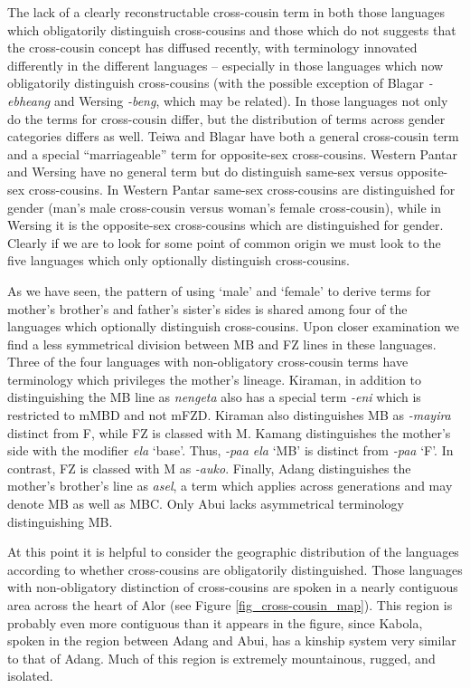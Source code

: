 The lack of a clearly reconstructable cross-cousin term in both those languages which obligatorily distinguish cross-cousins and those which do not suggests that the cross-cousin concept has diffused recently, with terminology innovated differently in the different languages -- especially in those languages which now obligatorily distinguish cross-cousins (with the possible exception of Blagar \textit{-ebheang} and Wersing \textit{-beng}, which may be related). In those languages not only do the terms for cross-cousin differ, but the distribution of terms across gender categories differs as well. Teiwa and Blagar have both a general cross-cousin term and a special ``marriageable'' term for opposite-sex cross-cousins. Western Pantar and Wersing have no general term but do distinguish same-sex versus opposite-sex cross-cousins. In Western Pantar same-sex cross-cousins are distinguished for gender (man's male cross-cousin versus woman's female cross-cousin), while in Wersing it is the opposite-sex cross-cousins which are distinguished for gender. Clearly if we are to look for some point of common origin we must look to the five languages which only optionally distinguish cross-cousins.

As we have seen, the pattern of using `male' and `female' to derive terms for mother's brother's and father's sister's sides is shared among four of the languages which optionally distinguish cross-cousins. Upon closer examination we find a less symmetrical division between MB and FZ lines in these languages. Three of the four languages with non-obligatory cross-cousin terms have terminology which privileges the mother's lineage. Kiraman, in addition to distinguishing the MB line as \textit{nengeta} also has a special term \textit{-eni} which is restricted to mMBD and not mFZD. Kiraman also distinguishes MB as \textit{-mayira} distinct from F, while FZ is classed with M. Kamang distinguishes the mother's side with the modifier \textit{ela} `base'. Thus, \textit{-paa ela} `MB' is distinct from \textit{-paa} `F'. In contrast, FZ is classed with M as \textit{-auko}. Finally, Adang distinguishes the mother's brother's line as \textit{asel}, a term which applies across generations and may denote MB as well as MBC. Only Abui lacks asymmetrical terminology distinguishing MB.

At this point it is helpful to consider the geographic distribution of the languages according to whether cross-cousins are obligatorily distinguished. Those languages with non-obligatory distinction of cross-cousins are spoken in a nearly contiguous area across the heart of Alor (see Figure \ref{fig_cross-cousin_map}). This region is probably even more contiguous than it appears in the figure, since Kabola, spoken in the region between Adang and Abui, has a kinship system very similar to that of Adang. Much of this region is extremely mountainous, rugged, and isolated.

